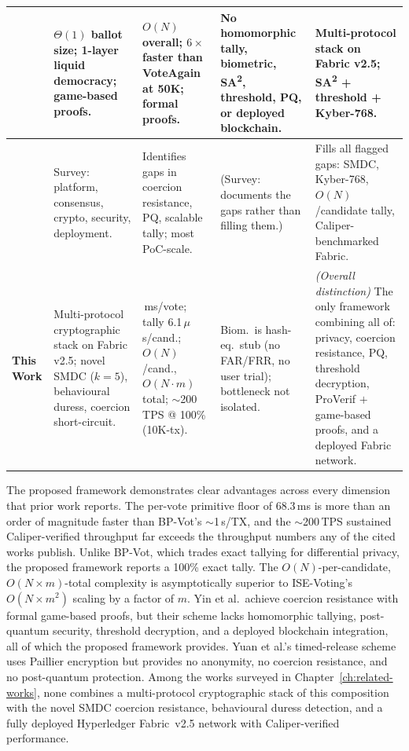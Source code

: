 \begin{longtable}{|>{\raggedright\arraybackslash}p{0.7cm}|>{\raggedright\arraybackslash}p{2.6cm}|>{\raggedright\arraybackslash}p{2.7cm}|>{\raggedright\arraybackslash}p{2.7cm}|>{\raggedright\arraybackslash}p{3.0cm}|}
\cite{yin_tdsc} &
$\Theta(1)$ ballot size; 1-layer liquid democracy; game-based proofs. &
$O(N)$ overall; $6\times$ faster than VoteAgain at 50K; formal proofs. &
No homomorphic tally, biometric, SA\textsuperscript{2}, threshold, PQ, or deployed blockchain. &
Multi-protocol stack on Fabric v2.5; SA\textsuperscript{2} + threshold + Kyber-768. \\
\hline

\cite{evoting_survey_springer} &
Survey: platform, consensus, crypto, security, deployment. &
Identifies gaps in coercion resistance, PQ, scalable tally; most PoC-scale. &
(Survey: documents the gaps rather than filling them.) &
Fills all flagged gaps: SMDC, Kyber-768, $O(N)$/candidate tally, Caliper-benchmarked Fabric. \\
\hline

\textbf{This Work} &
Multi-protocol cryptographic stack on Fabric v2.5; novel SMDC ($k{=}5$), behavioural duress, coercion short-circuit. &
68.3\,ms/vote; tally 6.1\,$\mu$s/cand.; $O(N)$/cand., $O(N{\cdot}m)$ total; $\sim$200\,TPS @ 100\% (10K-tx). &
Biom.\ is hash-eq.\ stub (no FAR/FRR, no user trial); bottleneck not isolated. &
\emph{(Overall distinction)} The only framework combining all of: privacy, coercion resistance, PQ, threshold decryption, ProVerif $+$ game-based proofs, and a deployed Fabric network. \\

\end{longtable}

The proposed framework demonstrates clear advantages across every dimension that prior work reports. The per-vote primitive floor of 68.3\,ms is more than an order of magnitude faster than BP-Vot's $\sim$1\,s/TX, and the $\sim$200\,TPS sustained Caliper-verified throughput far exceeds the throughput numbers any of the cited works publish. Unlike BP-Vot, which trades exact tallying for differential privacy, the proposed framework reports a 100\% exact tally. The $O(N)$-per-candidate, $O(N\!\times\!m)$-total complexity is asymptotically superior to ISE-Voting's $O(N\!\times\!m^{2})$ scaling by a factor of $m$. Yin et al.\ achieve coercion resistance with formal game-based proofs, but their scheme lacks homomorphic tallying, post-quantum security, threshold decryption, and a deployed blockchain integration, all of which the proposed framework provides. Yuan et al.'s timed-release scheme uses Paillier encryption but provides no anonymity, no coercion resistance, and no post-quantum protection. Among the works surveyed in Chapter~\ref{ch:related-works}, none combines a multi-protocol cryptographic stack of this composition with the novel SMDC coercion resistance, behavioural duress detection, and a fully deployed Hyperledger Fabric~v2.5 network with Caliper-verified performance.

